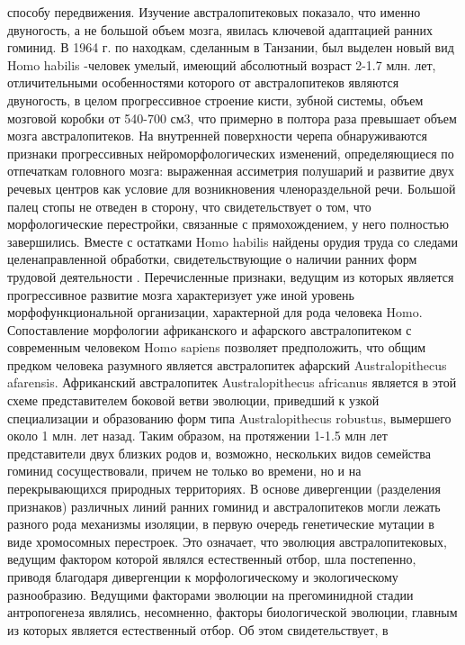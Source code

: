 \documentclass[12pt]{article}
\begin{document}
способу передвижения. Изучение австралопитековых показало, что именно двуногость, а не большой объем
мозга, явилась ключевой адаптацией ранних гоминид. В 1964 г. по находкам, сделанным в Танзании, был
выделен  новый  вид  Homo  habilis  -человек  умелый,  имеющий  абсолютный  возраст  2-1.7  млн.  лет,
отличительными особенностями которого от австралопитеков являются двуногость, в целом прогрессивное
строение  кисти,  зубной  системы,  объем  мозговой  коробки  от  540-700  см3,  что  примерно  в  полтора  раза
превышает  объем  мозга  австралопитеков.  На  внутренней  поверхности  черепа  обнаруживаются  признаки
прогрессивных  нейроморфологических  изменений,  определяющиеся  по  отпечаткам  головного  мозга:
выраженная  ассиметрия  полушарий  и  развитие  двух  речевых  центров  как  условие  для  возникновения
членораздельной  речи.  Большой  палец  стопы  не  отведен  в  сторону,  что  свидетельствует  о  том,  что
морфологические  перестройки,  связанные  с  прямохождением,  у  него  полностью  завершились.  Вместе  с
остатками Homo habilis найдены орудия труда со следами целенаправленной обработки, свидетельствующие о
наличии ранних форм трудовой деятельности .
Перечисленные признаки, ведущим из которых является прогрессивное развитие мозга характеризует уже иной
уровень  морфофункциональной  организации,  характерной  для  рода  человека   Homo.  Сопоставление
морфологии африканского и афарского австралопитеком с современным человеком Homo sapiens позволяет
предположить,  что  общим  предком  человека  разумного  является  австралопитек  афарский  Australopithecus
afarensis. Африканский австралопитек Australopithecus africanus является в этой схеме представителем боковой
ветви  эволюции,  приведший  к  узкой  специализации  и  образованию  форм  типа  Australopithecus  robustus,
вымершего около 1 млн. лет назад. Таким образом, на протяжении 1-1.5 млн лет представители двух близких
родов и, возможно, нескольких видов семейства гоминид сосуществовали, причем не только во времени, но и на
перекрывающихся природных территориях. В основе дивергенции (разделения признаков) различных линий
ранних  гоминид  и  австралопитеков  могли  лежать  разного  рода  механизмы  изоляции,  в  первую  очередь
генетические  мутации  в  виде  хромосомных  перестроек.  Это  означает,  что  эволюция  австралопитековых,
ведущим фактором которой являлся естественный отбор, шла постепенно, приводя благодаря дивергенции к
морфологическому и экологическому разнообразию.
Ведущими  факторами  эволюции  на  прегоминидной  стадии  антропогенеза  являлись,  несомненно,  факторы
биологической  эволюции,  главным  из  которых  является  естественный  отбор.  Об  этом  свидетельствует,  в
\end{document}
